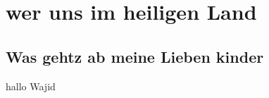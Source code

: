 %
%

\chapter{wer uns im heiligen Land}

\section{Was gehtz ab meine Lieben kinder}


hallo Wajid


%
%